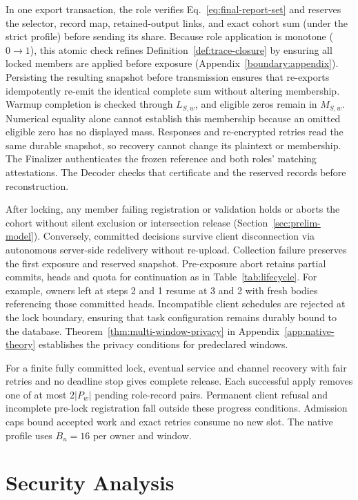 \documentclass[conference,compsoc]{IEEEtran}
\theoremstyle{definition}
\numberwithin{equation}{section}
\numberwithin{table}{section}
\numberwithin{figure}{section}
\theoremstyle{plain}
\begin{document}
In one export transaction, the role verifies Eq.~\eqref{eq:final-report-set} and reserves the
selector, record map, retained-output links, and exact cohort sum
(\label{sec:profiles}\label{sec:dp}under the strict profile) before sending its share.
Because role application is monotone (\(0 \to 1\)), this atomic check refines
Definition~\ref{def:trace-closure} by ensuring all locked members are applied before exposure (Appendix~\ref{boundary:appendix}).
Persisting the resulting snapshot before transmission ensures that re-exports idempotently
re-emit the identical complete sum without altering membership. Warmup completion is checked
through \(L_{S,w}\), and eligible zeros remain in \(M_{S,w}\). Numerical equality alone cannot
establish this membership because an omitted eligible zero has no displayed mass.
Responses and re-encrypted retries
read the same durable snapshot, so recovery cannot change its plaintext or
membership. The Finalizer authenticates the frozen reference and both roles'
matching attestations. The Decoder checks that certificate and the reserved
records before reconstruction.

After locking, any member failing registration or validation holds or aborts the
cohort without silent exclusion or intersection release (Section~\ref{sec:prelim-model}).
Conversely, committed decisions survive client disconnection via autonomous
server-side redelivery without re-upload. Collection failure preserves the
first exposure and reserved snapshot. Pre-exposure abort retains partial commits,
heads and quota for continuation as in Table~\ref{tab:lifecycle}.
For example, owners left at steps 2 and 1 resume at 3 and 2 with fresh bodies
referencing those committed heads. Incompatible client schedules are rejected at the lock
boundary, ensuring that task configuration remains durably bound to the database. Theorem~\ref{thm:multi-window-privacy}
in Appendix~\ref{app:native-theory} establishes the privacy conditions for predeclared windows.

\label{prop:native-post-admission-progress}
For a finite fully committed lock, eventual service and channel recovery with
fair retries and no deadline stop gives complete release. Each successful apply
removes one of at most \(2|P_w|\) pending role-record pairs. Permanent client refusal and incomplete pre-lock registration fall outside
these progress conditions. Admission caps bound accepted work and exact retries
consume no new slot. The native profile uses \(B_u=16\) per owner and window.

\section{Security Analysis}
\label{sec:security-summary}
\end{document}
